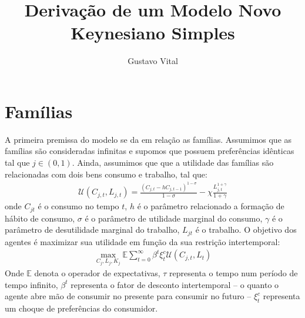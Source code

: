 \documentclass[10pt,a4paper]{article}
\author{Gustavo Vital}
\title{Derivação de um Modelo Novo Keynesiano Simples}
\begin{document}
\maketitle

\tableofcontents

\section{Famílias}
A primeira premissa do modelo se da em relação as famílias. Assumimos que as famílias são consideradas infinitas e supomos que possuem preferências idênticas tal que $j \in (0,1)$. Ainda, assumimos que que a utilidade das famílias são relacionadas com dois bens consumo e trabalho, tal que:
\begin{align} \label{utilidade}
\mathcal{U}(C_{j,t}, L_{j,t}) = \frac{(C_{j,t} - hC_{j,t-1})^{1-\sigma}}{1-\sigma} - \chi \frac{L_{j,t}^{1 + \gamma}}{1 + \gamma}
\end{align}
\noindent
onde $C_{jt}$ é o consumo no tempo $t$, $h$ é o parâmetro relacionado a formação de hábito de consumo, $\sigma$ é o parâmetro de utilidade marginal do consumo, $\gamma$ é o parâmetro de desutilidade marginal do trabalho, $L_{jt}$ é o trabalho. O objetivo dos agentes é maximizar sua utilidade em função da sua restrição intertemporal:
\begin{align}
\max_{C_j, L_j, K_j}\mathbb{E}\sum_{t=0}^{\infty}\beta^{t}\xi_{t}^{c}\mathcal{U}(C_{j,t},L_t)
\end{align}
\noindent
Onde $\mathbb{E}$ denota o operador de expectativas, $\tau$ representa o tempo num período de tempo infinito, $\beta^t$ representa o fator de desconto intertemporal -- o quanto o agente abre mão de consumir no presente para consumir no futuro -- $\xi_{t}^{c}$ representa um choque de preferências do consumidor.\\
\end{document}
